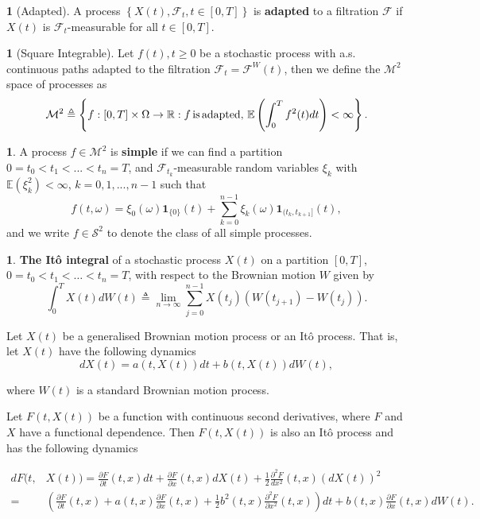 \documentclass[british]{amsart}
\numberwithin{equation}{section}
\numberwithin{figure}{section}
\theoremstyle{plain}
\theoremstyle{definition}
\newtheorem{defn}[thm]{\protect\definitionname}
\theoremstyle{plain}
\theoremstyle{plain}
\theoremstyle{plain}
\theoremstyle{remark}
\theoremstyle{plain}
\providecommand{\definitionname}{Definition}
\begin{document}
\begin{defn} [Adapted]
	A process $\left\{ X(t),\mathcal{F}_{t},t\in[0,T]\right\} $ is \textbf{adapted}
	to a filtration $\mathcal{F}$ if $X(t)$ is $\mathcal{F}_{t}$-measurable
	for all $t\in[0,T]$. 
\end{defn}

\begin{defn} [Square Integrable]
	Let $f(t),t\ge0$ be a stochastic process with a.s. continuous paths
	adapted to the filtration $\mathcal{F}_{t}=\mathcal{F}^{W}(t)$, then
	we define the $\mathcal{M}^{2}$ space of processes as
	\begin{equation*}
	\mathcal{M}^{2}\triangleq\left\{ f:[0,T]\times\Omega\to\mathbb{R}:f\,\text{is\,adapted},\,\mathbb{E}\left(\int_{0}^{T}f^{2}(t)dt\right)<\infty\right\} .
	\end{equation*}
\end{defn}

\begin{defn}
A process $f\in\mathcal{M}^{2}$ is \textbf{simple} if we can find
a partition $0=t_{0}<t_{1}<...<t_{n}=T$, and $\mathcal{F}_{t_{k}}$-measurable
random variables $\xi_{k}$ with $\mathbb{E}(\xi_{k}^{2})<\infty$,
$k=0,1,...,n-1$ such that
\[
f(t,\omega)=\xi_{0}(\omega)\mathbf{1}_{\{0\}}(t)+\sum_{k=0}^{n-1}\xi_{k}(\omega)\mathbf{1}_{(t_{k},t_{k+1}]}(t),
\]
 and we write $f\in\mathcal{S}^{2}$ to denote the class of all simple
processes.
\end{defn}
%
\begin{defn}
\textbf{The Itô integral} of a stochastic process $X(t)$ on a partition
$[0,T]$, $0=t_{0}<t_{1}<\ldots<t_{n}=T$, with respect to the Brownian
motion $W$ given by
\[
\int_{0}^{T}X(t)dW(t)\triangleq\lim_{n\to\infty}\sum_{j=0}^{n-1}X(t_{j})\left(W(t_{j+1})-W(t_{j})\right).
\]
%
\end{defn}
Let $X(t)$ be a generalised Brownian motion process or an Itô process.
That is, let $X(t)$ have the following dynamics
%
\begin{equation}
dX(t)=a(t,X(t))dt+b(t,X(t))dW(t),
\end{equation}

where $W(t)$ is a standard Brownian motion process.

Let $F(t,X(t))$ be a function with continuous second derivatives,
where $F$ and $X$ have a functional dependence. Then $F(t,X(t))$
is also an Itô process and has the following dynamics

\begin{align*}
dF(t, & X(t))=\frac{\partial F}{\partial t}(t,x)dt+\frac{\partial F}{\partial x}(t,x)dX(t)+\frac{1}{2}\frac{\partial^{2}F}{dx^{2}}(t,x)(dX(t))^{2}\\
= & \left(\frac{\partial F}{\partial t}(t,x)+a(t,x)\frac{\partial F}{\partial x}(t,x)+\frac{1}{2}b^{2}(t,x)\frac{\partial^{2}F}{\partial x^{2}}(t,x)\right)dt+b(t,x)\frac{\partial F}{\partial x}(t,x)dW(t).\\
\end{align*}
\end{document}
